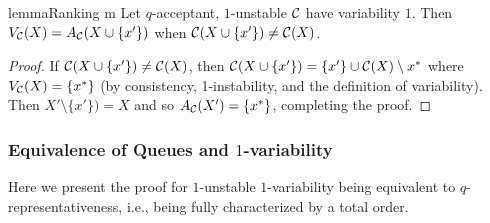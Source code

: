 \begin{restatable}{lemma}{Ranking m}
\label{lem:a-v-equal}
Let $q$-acceptant, $1$-unstable $\mathcal{C}$ have variability $1$. Then $V_{\mathcal{C}}(X) = A_{\mathcal{C}}(X \cup \{x'\})$ when $\mathcal{C}(X \cup \{x'\}) \neq \mathcal{C}(X)$.
\end{restatable}

\begin{proof}
If $\mathcal{C}(X \cup \{x'\}) \neq \mathcal{C}(X)$, then $\mathcal{C}(X \cup \{x'\}) = \{x'\} \cup \mathcal{C}(X) \setminus x^*$ where $V_{\mathcal{C}}(X) = \{x^*\}$ (by consistency, 1-instability, and the definition of variability). Then $X' \setminus \{x'\}) = X$ and so $A_{\mathcal{C}}(X') = \{x^*\}$, completing the proof.
\end{proof}

\subsubsection{Equivalence of Queues and $1$-variability}
Here we present the proof for $1$-unstable $1$-variability being equivalent to $q$-representativeness, i.e., being fully characterized by a total order.

